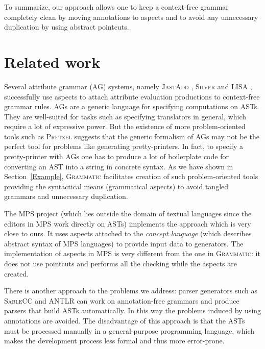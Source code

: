 \documentclass{IOS-Book-Article}     %
\newcommand{\secref}[1]{Section~\ref{#1}}
\newcommand{\tool}[1]{\textsc{#1}}
\newcommand{\Grammatic}[0]{\tool{Grammatic}}
\begin{document}
To summarize, our approach allows one to keep a context-free grammar completely clean by moving annotations to aspects and to avoid any unnecessary duplication by using abstract pointcuts. 

\section{Related work}\label{Related}

Several attribute grammar (AG) systems, namely \tool{JastAdd} \cite{JastAdd}, \tool{Silver} \cite{Silver} and \tool{LISA} \cite{LISA}, successfully use aspects to attach attribute evaluation productions to context-free grammar rules.
AGs are a generic language for specifying computations on ASTs. They are well-suited for tasks such as specifying translators in general, which require a lot of expressive power. But the existence of more problem-oriented tools such as \tool{Pretzel} \cite{Pretzel} suggests that the generic formalism of AGs may not be the perfect tool for problems like generating pretty-printers.
In fact, to specify a pretty-printer with AGs one has to produce a lot of boilerplate code for converting an AST into a string in concrete syntax.
As we have shown in \secref{Example}, \Grammatic{} facilitates creation of such problem-oriented tools providing the syntactical means (grammatical aspects) to avoid tangled grammars and unnecessary duplication.

The \tool{MPS} \cite{MPS} project (which lies outside the domain of textual languages since the editors in \tool{MPS} work directly on ASTs) implements the approach which is very close to ours. It uses aspects attached to the \emph{concept language} (which describes abstract syntax of \tool{MPS} languages) to provide input data to generators. The implementation of aspects in \tool{MPS} is very different from the one in \Grammatic{}: it does not use pointcuts and performs all the checking while the aspects are created.

There is another approach to the problems we address: parser generators such as \tool{SableCC} \cite{SableCC} and \tool{ANTLR} \cite{ANTLR} can work on annotation-free grammars and produce parsers that build ASTs automatically. In this way the problems induced by using annotations are avoided. The disadvantage of this approach is that the ASTs must be processed manually in a general-purpose programming language, which makes the development process less formal and thus more error-prone.
\end{document}
